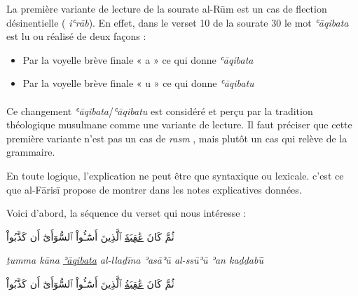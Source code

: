\documentclass[a4paper,12pt]{report}
\begin{document}
\begin{itemize}
\begin{enumerate}
La première variante de lecture de la sourate al-Rūm est un cas de flection désinentielle 	( \textit{iʿrāb}). En effet, dans le verset 10 de la sourate 30 le mot \textit{ʿāqibata} est lu ou réalisé de deux façons :  
\begin{itemize}


\item   Par la voyelle brève finale « a »  ce qui donne \textit{ʿāqibata}

\item    Par la voyelle brève finale « u »  ce qui donne \textit{ʿāqibatu}
\end{itemize}
\paragraph{}

Ce changement \textit{ʿāqibata}/\textit{ʿāqibatu} est considéré et perçu par la tradition théologique musulmane comme une variante de lecture. Il faut préciser  que cette première variante  n'est pas un cas de  \textit{rasm} ,  mais plutôt un cas qui relève de la grammaire. 

En toute logique, l'explication  ne  peut être que  syntaxique ou lexicale.  c'est ce que al-F\=aris\=i propose de montrer   dans les  notes explicatives données. 

 Voici d'abord, la  séquence du verset qui nous intéresse : 

 
 \begin{Arabic}
   \begin{center}
      
    


ثُمَّ كَانَ 
\underline { عَٰقِبَةَ}
ٱلَّذِينَ أَسَٰٓـُٔواْ ٱلسُّوٓأَىٰٓ أَن كَذَّبُواْ 

   \end{center}

 \end{Arabic}

\begin{center}
  \textit{  ṯumma kāna \underline {ʾāqibata} al-llaḏīna ʾasāʾū al-ss\=uʾū  ʾan  kaḏḏabū}̄
\end{center}



\begin{Arabic}
   \begin{center}
      

ثُمَّ كَانَ 
\underline {عَٰقِبَةُ}
ٱلَّذِينَ أَسَٰٓـُٔواْ ٱلسُّوٓأَىٰٓ أَن كَذَّبُواْ 

   \end{center}


\end{Arabic}
\end{enumerate}
\end{itemize}
\end{document}
